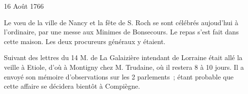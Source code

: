                      

                     \begin{diary}{16 Août 1766}{}
                        
                         Le vœu de la
                              ville de Nancy et la fête de S. Roch
                           se sont célébrés aujoud'hui à l'ordinaire, par
                           une messe aux Minimes de
                              Bonsecours. Le repas
                           s'est fait dans cette maison. Les deux procureurs
                           généraux y étaient. \bigskip
        
        
                         Suivant des lettres du 14
                           M. de La Galaizière
                           intendant
                           de Lorraine était allé la veille à Etiole, d'où à
                           Montigny
                           chez
                           M. Trudaine, où il restera 8 à 10
                           jours. Il a envoyé son mémoire
                              d'observations
                              sur les 2 parlements ; étant probable que cette
                           affaire se décidera bientôt à Compiègne. \bigskip
        
        
                     \end{diary}

